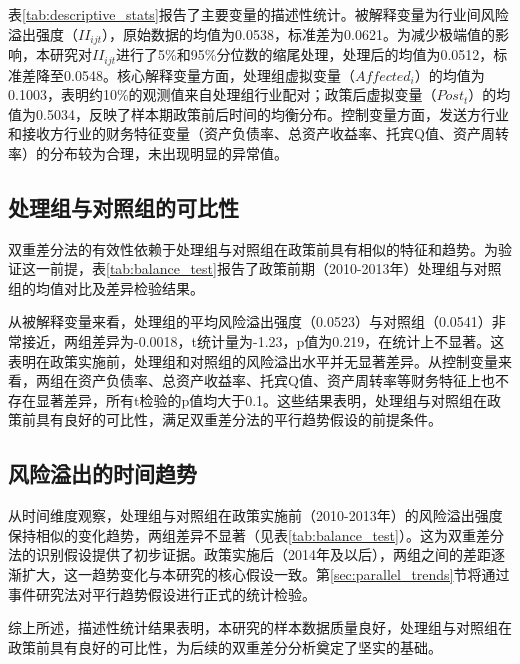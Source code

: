 表\ref{tab:descriptive_stats}报告了主要变量的描述性统计。被解释变量为行业间风险溢出强度（$II_{ijt}$），原始数据的均值为0.0538，标准差为0.0621。为减少极端值的影响，本研究对$II_{ijt}$进行了5\%和95\%分位数的缩尾处理，处理后的均值为0.0512，标准差降至0.0548。核心解释变量方面，处理组虚拟变量（$Affected_i$）的均值为0.1003，表明约10\%的观测值来自处理组行业配对；政策后虚拟变量（$Post_t$）的均值为0.5034，反映了样本期政策前后时间的均衡分布。控制变量方面，发送方行业和接收方行业的财务特征变量（资产负债率、总资产收益率、托宾Q值、资产周转率）的分布较为合理，未出现明显的异常值。


\subsection{处理组与对照组的可比性}

双重差分法的有效性依赖于处理组与对照组在政策前具有相似的特征和趋势。为验证这一前提，表\ref{tab:balance_test}报告了政策前期（2010-2013年）处理组与对照组的均值对比及差异检验结果。

从被解释变量来看，处理组的平均风险溢出强度（0.0523）与对照组（0.0541）非常接近，两组差异为-0.0018，t统计量为-1.23，p值为0.219，在统计上不显著。这表明在政策实施前，处理组和对照组的风险溢出水平并无显著差异。从控制变量来看，两组在资产负债率、总资产收益率、托宾Q值、资产周转率等财务特征上也不存在显著差异，所有t检验的p值均大于0.1。这些结果表明，处理组与对照组在政策前具有良好的可比性，满足双重差分法的平行趋势假设的前提条件。


\subsection{风险溢出的时间趋势}

从时间维度观察，处理组与对照组在政策实施前（2010-2013年）的风险溢出强度保持相似的变化趋势，两组差异不显著（见表\ref{tab:balance_test}）。这为双重差分法的识别假设提供了初步证据。政策实施后（2014年及以后），两组之间的差距逐渐扩大，这一趋势变化与本研究的核心假设一致。第\ref{sec:parallel_trends}节将通过事件研究法对平行趋势假设进行正式的统计检验。

综上所述，描述性统计结果表明，本研究的样本数据质量良好，处理组与对照组在政策前具有良好的可比性，为后续的双重差分分析奠定了坚实的基础。


